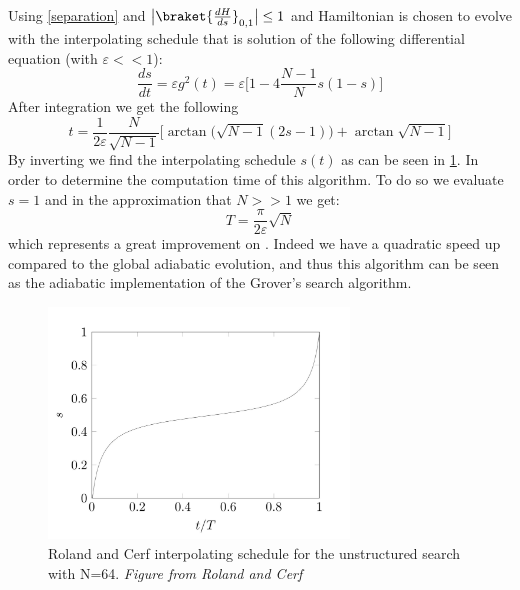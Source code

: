     Using \cref{separation} and $\big|\braket{\frac{dH}{ds}}_{0,1}\big| \leq 1$ and Hamiltonian is chosen to evolve with the interpolating schedule that is solution of the following differential equation (with $\varepsilon<<1$):
    \begin{equation}
      \frac{ds}{dt} = \varepsilon g^2(t) = \varepsilon\Big[1-4\frac{N-1}{N}s(1-s)\Big]
    \end{equation}
    After integration we get the following
    \begin{equation}
      t =\frac{1}{2\varepsilon}\frac{N}{\sqrt{N-1}}\Big[\arctan\big(\sqrt{N-1}(2s-1)\big) + \arctan{\sqrt{N-1}}\Big]
    \end{equation}
    By inverting we find the interpolating schedule $s(t)$ as can be seen in \cref{interpolating_schedule}. In order to determine the computation time of this algorithm. To do so we evaluate $s=1$ and in the approximation that $N>>1$ we get:
    \begin{equation}
      T = \frac{\pi}{2\varepsilon}\sqrt{N}
    \end{equation}
    which represents a great improvement on . Indeed we have a quadratic speed up compared to the global adiabatic evolution, and thus this algorithm can be seen as the adiabatic implementation of the Grover's search algorithm.
    \begin{figure}[!htb]
      \centering
      \includegraphics[width=80mm]{figures/chapter1/interpolating_schedule.pdf}
      \caption[Roland and Cerf interpolating schedule for the unstructured search with N=64]{Roland and Cerf interpolating schedule for the unstructured search with N=64. \textit{Figure from Roland and Cerf} \cite{Roland2002}}
      \label{interpolating_schedule}
    \end{figure}


\clearpage
